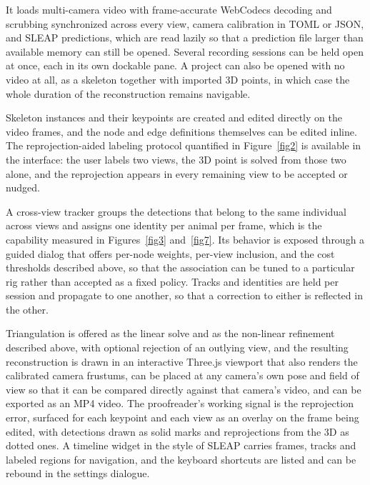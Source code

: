\documentclass[pdflatex, sn-nature]{sn-jnl}
\theoremstyle{thmstyleone}%
\theoremstyle{thmstyletwo}%
\theoremstyle{thmstylethree}%
\begin{document}
It loads multi-camera video with frame-accurate WebCodecs decoding and scrubbing synchronized across every view, camera calibration in TOML or JSON, and SLEAP predictions, which are read lazily so that a prediction file larger than available memory can still be opened. Several recording sessions can be held open at once, each in its own dockable pane. A project can also be opened with no video at all, as a skeleton together with imported 3D points, in which case the whole duration of the reconstruction remains navigable.

Skeleton instances and their keypoints are created and edited directly on the video frames, and the node and edge definitions themselves can be edited inline. The reprojection-aided labeling protocol quantified in Figure~\ref{fig2} is available in the interface: the user labels two views, the 3D point is solved from those two alone, and the reprojection appears in every remaining view to be accepted or nudged.

A cross-view tracker groups the detections that belong to the same individual across views and assigns one identity per animal per frame, which is the capability measured in Figures~\ref{fig3} and~\ref{fig7}. Its behavior is exposed through a guided dialog that offers per-node weights, per-view inclusion, and the cost thresholds described above, so that the association can be tuned to a particular rig rather than accepted as a fixed policy. Tracks and identities are held per session and propagate to one another, so that a correction to either is reflected in the other.

Triangulation is offered as the linear solve and as the non-linear refinement described above, with optional rejection of an outlying view, and the resulting reconstruction is drawn in an interactive Three.js viewport that also renders the calibrated camera frustums, can be placed at any camera's own pose and field of view so that it can be compared directly against that camera's video, and can be exported as an MP4 video. The proofreader's working signal is the reprojection error, surfaced for each keypoint and each view as an overlay on the frame being edited, with detections drawn as solid marks and reprojections from the 3D as dotted ones. A timeline widget in the style of SLEAP carries frames, tracks and labeled regions for navigation, and the keyboard shortcuts are listed and can be rebound in the settings dialogue.
\end{document}
